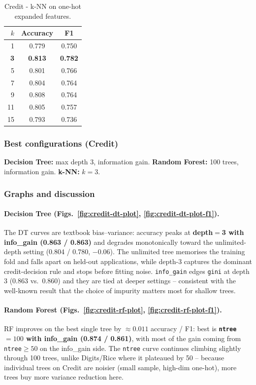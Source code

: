 \documentclass[11pt]{article}
\begin{document}
\begin{table}[ht!!]
  \centering
  \footnotesize
  \caption{Credit - k-NN on one-hot expanded features.}
  \label{tab:credit-knn}
  \begin{tabular}{rcc}
    \toprule
    $k$ & Accuracy & F1 \\
    \midrule
    1 & 0.779 & 0.750 \\
    \textbf{3} & \textbf{0.813} & \textbf{0.782} \\
    5 & 0.801 & 0.766 \\
    7 & 0.804 & 0.764 \\
    9 & 0.808 & 0.764 \\
    11 & 0.805 & 0.757 \\
    15 & 0.793 & 0.736 \\
    \bottomrule
  \end{tabular}
\end{table}
\newpage

\subsubsection{Best configurations (Credit)}
\textbf{Decision Tree:} max depth 3, information gain. \newline
\textbf{Random Forest:} 100 trees, information gain. \newline
\textbf{k-NN:} $k=3$.

\subsubsection{Graphs and discussion}

\paragraph{Decision Tree (Figs.~\ref{fig:credit-dt-plot}, \ref{fig:credit-dt-plot-f1}).}
The DT curves are textbook bias--variance: accuracy peaks at \textbf{depth$=$3 with info\_gain (0.863 / 0.863)} and degrades monotonically toward the unlimited-depth setting (0.804 / 0.780, $-0.06$). The unlimited tree memorises the training fold and falls apart on held-out applications, while depth-3 captures the dominant credit-decision rule and stops before fitting noise. \texttt{info\_gain} edges \texttt{gini} at depth 3 (0.863 vs.\ 0.860) and they are tied at deeper settings -- consistent with the well-known result that the choice of impurity matters most for shallow trees.

\paragraph{Random Forest (Figs.~\ref{fig:credit-rf-plot}, \ref{fig:credit-rf-plot-f1}).}
RF improves on the best single tree by $\approx 0.011$ accuracy / F1: best is \textbf{\texttt{ntree}$=100$ with info\_gain (0.874 / 0.861)}, with most of the gain coming from \texttt{ntree}$\geq 50$ on the info\_gain side. The \texttt{ntree} curve continues climbing slightly through 100 trees, unlike Digits/Rice where it plateaued by 50 -- because individual trees on Credit are noisier (small sample, high-dim one-hot), more trees buy more variance reduction here.
\end{document}
